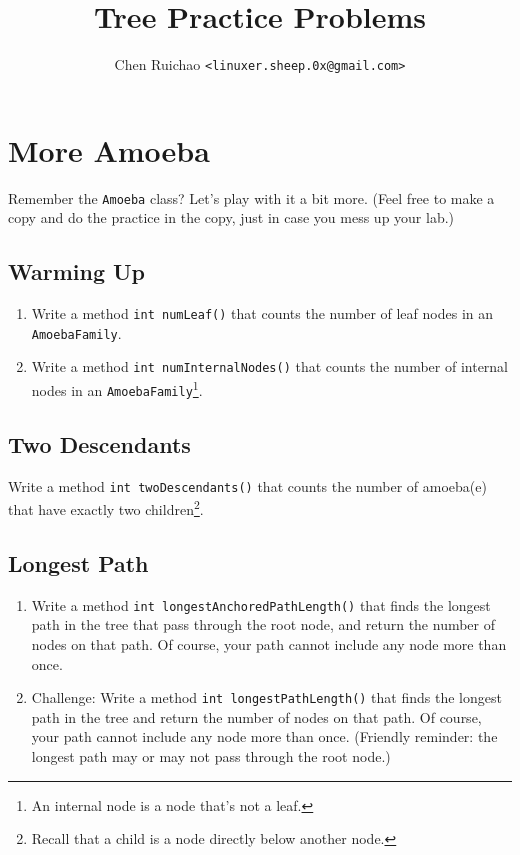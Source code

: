 \documentclass{article}
\begin{document}

\title{Tree Practice Problems}
\author{Chen Ruichao \texttt{<linuxer.sheep.0x@gmail.com>}}
\date{} %
\maketitle



\section{More Amoeba}
Remember the \verb|Amoeba| class?  Let's play with it a bit more.  (Feel free to make a copy and do the practice in the copy, just in case you mess up your lab.)

\subsection{Warming Up}
\begin{enumerate}
    \item Write a method \verb|int numLeaf()|          that counts the number of leaf     nodes in an \verb|AmoebaFamily|.
    \item Write a method \verb|int numInternalNodes()| that counts the number of internal nodes in an \verb|AmoebaFamily|\footnote{An internal node is a node that's not a leaf.}.
\end{enumerate}



\subsection{Two Descendants}
Write a method \verb|int twoDescendants()| that counts the number of amoeba(e) that have exactly two children\footnote{Recall that a child is a node directly below another node.}.

\subsection{Longest Path}

\begin{enumerate}
    \item Write a method \verb|int longestAnchoredPathLength()| that finds the longest path in the tree that pass through the root node, and return the number of nodes on that path.  Of course, your path cannot include any node more than once.
    \item Challenge: Write a method \verb|int longestPathLength()| that finds the longest path in the tree and return the number of nodes on that path.  Of course, your path cannot include any node more than once.  (Friendly reminder: the longest path may or may not pass through the root node.)
\end{enumerate}
\end{document}
